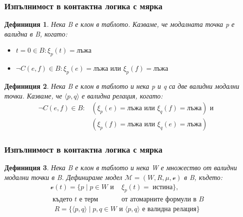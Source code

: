 \documentclass{beamer}
\newtheorem{defn}{Дефиниция}[section]
\newcommand{\vE}{\mathscr{v}}
\newcommand{\vBool}{\xi}
\begin{document}
\begin{frame}\frametitle{Изпълнимост в контактна логика с мярка}
	\begin{defn}%
	Нека B е клон в таблото. Казваме, че модалната точка p е валидна в B, когато:
	\begin{itemize}
		\item $t = 0 \in B:  \vBool_{p}(t) = \textbf{лъжа}$
		\item $\neg C(e, f) \in B: \vBool_{p}(e) = \textbf{лъжа} \textit{ или } \vBool_{p}(f) = \textbf{лъжа}$
	\end{itemize}
	\end{defn}

	\begin{defn}
		Нека B е клон в таблото и нека p и q са две валидни модални точки. Казваме, че $\langle p, q \rangle$ е валидна релация, когато:
		\begin{align*}
				\neg C(e, f) \in B: &(\vBool_{p}(e) = \textbf{лъжа} \textit{ или } \vBool_{q}(f) = \textbf{лъжа}) \textit{ и } \\
				 &(\vBool_{p}(f) = \textbf{лъжа} \textit{ или } \vBool_{q}(e) = \textbf{лъжа})
		\end{align*}
	\end{defn}
\end{frame}

\begin{frame}\frametitle{Изпълнимост в контактна логика с мярка}
	\begin{defn}
Нека B е клон в таблото и нека W е множество от валидни модални точки в B. Дефинираме модел $\mathcal{M} = (W, R, \mu, \vE)$ в B, където:
		\begin{align*}
				\vE(t) = \{ p \; | \; p \in W \textit{ и } &\vBool_{p}(t) =\; \textit{истина} \}, \\
				\textit{ където t е терм } & \textit{от атомарните формули в B}
		\end{align*}
		\begin{align*}
				R = \{ \langle p, q \rangle\; | \; p, q \in W \textit{ и } \langle p, q \rangle \textit{ е валидна релация}\}
		\end{align*}
	\end{defn}
\end{frame}
\end{document}
